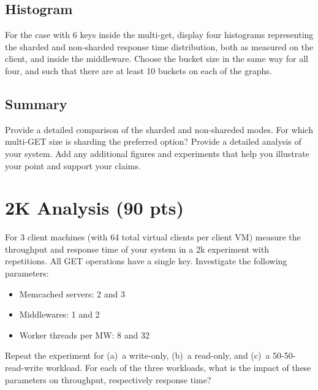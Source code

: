 \documentclass[11pt,a4paper]{article}
\begin{document}
\subsection{Histogram}

For the case with 6 keys inside the multi-get, display four histograms representing the sharded and non-sharded response time distribution, both as measured on the client, and inside the middleware. Choose the bucket size in the same way for all four, and such that there are at least 10 buckets on each of the graphs.

\subsection{Summary}

Provide a detailed comparison of the sharded and non-shareded modes. For which multi-GET size is sharding the preferred option? Provide a detailed analysis of your system. Add any additional figures and experiments that help you illustrate your point and support your claims.

\section{2K Analysis (90 pts)}

For 3 client machines (with 64 total virtual clients per client VM) measure the throughput and response time of your system in a 2k experiment with repetitions. All GET operations have a single key. Investigate the following parameters:

\begin{itemize}

	\item Memcached servers: 2 and 3
	\item Middlewares: 1 and 2
	\item Worker threads per MW: 8 and 32

\end{itemize}

Repeat the experiment for (a)~a write-only, (b)~a read-only, and (c)~a 50-50-read-write workload.
For each of the three workloads, what is the impact of these parameters on throughput, respectively response time?
\end{document}
